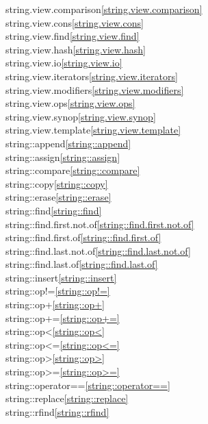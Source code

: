 \begin{multicols}{2}
string.view.comparison\quad\ref{string.view.comparison}\\
string.view.cons\quad\ref{string.view.cons}\\
string.view.find\quad\ref{string.view.find}\\
string.view.hash\quad\ref{string.view.hash}\\
string.view.io\quad\ref{string.view.io}\\
string.view.iterators\quad\ref{string.view.iterators}\\
string.view.modifiers\quad\ref{string.view.modifiers}\\
string.view.ops\quad\ref{string.view.ops}\\
string.view.synop\quad\ref{string.view.synop}\\
string.view.template\quad\ref{string.view.template}\\
string::append\quad\ref{string::append}\\
string::assign\quad\ref{string::assign}\\
string::compare\quad\ref{string::compare}\\
string::copy\quad\ref{string::copy}\\
string::erase\quad\ref{string::erase}\\
string::find\quad\ref{string::find}\\
string::find.first.not.of\quad\ref{string::find.first.not.of}\\
string::find.first.of\quad\ref{string::find.first.of}\\
string::find.last.not.of\quad\ref{string::find.last.not.of}\\
string::find.last.of\quad\ref{string::find.last.of}\\
string::insert\quad\ref{string::insert}\\
string::op!=\quad\ref{string::op!=}\\
string::op+\quad\ref{string::op+}\\
string::op+=\quad\ref{string::op+=}\\
string::op<\quad\ref{string::op<}\\
string::op<=\quad\ref{string::op<=}\\
string::op>\quad\ref{string::op>}\\
string::op>=\quad\ref{string::op>=}\\
string::operator==\quad\ref{string::operator==}\\
string::replace\quad\ref{string::replace}\\
string::rfind\quad\ref{string::rfind}\\

\end{multicols}
